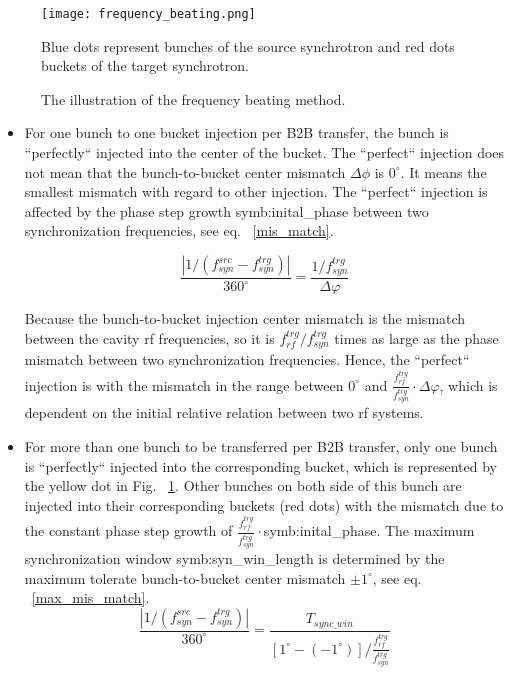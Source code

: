 \begin{figure}[!htb]
   \centering   
   \texttt{[image: frequency\_beating.png]}
   \caption{The illustration of the frequency beating method.}{Blue dots represent bunches of the source synchrotron and red dots buckets of the target synchrotron.}
   \label{frequency_beat}
\end{figure}
\begin{itemize}
\item
For one bunch to one bucket injection per B2B transfer, the bunch is ``perfectly`` injected into the center of the bucket. The ``perfect`` injection does not mean that the bunch-to-bucket center mismatch $\Delta \phi$ is $0^\circ$. It means the smallest mismatch with regard to other injection. The ``perfect`` injection is affected by the phase step growth \gls{symb:inital_phase} between two synchronization frequencies, see eq. ~\ref{mis_match}. 

\begin{equation}
\frac{|1/(f_{\mathit{syn}}^\mathit{src}-f_{\mathit{syn}}^\mathit{trg})|}{360^\circ} = \frac{1/f_{\mathit{syn}}^\mathit{trg}}{\Delta \varphi}\label{mis_match}
\end{equation}

Because the bunch-to-bucket injection center mismatch is the mismatch between the cavity rf frequencies, so it is $f_{\mathit{rf}}^{trg}/f_{\mathit{syn}}^{trg}$ times as large as the phase mismatch between two synchronization frequencies. Hence, the ``perfect`` injection is with the mismatch in the range between $0^\circ$ and $\frac{f_{\mathit{rf}}^\mathit{trg}}{f_{\mathit{syn}}^\mathit{trg}}\cdot\Delta \varphi$, which is dependent on the initial relative relation between two rf systems.

\item 
For more than one bunch to be transferred per B2B transfer, only one bunch is ``perfectly`` injected into the corresponding bucket, which is represented by the yellow dot in Fig. ~\ref{frequency_beat}. Other bunches on both side of this bunch are injected into their corresponding buckets (red dots) with the mismatch due to the constant phase step growth of $\frac{f_{\mathit{rf}}^\mathit{trg}}{f_{\mathit{syn}}^\mathit{trg}}\cdot$\gls{symb:inital_phase}. The maximum synchronization window \gls{symb:syn_win_length} is determined by the maximum tolerate bunch-to-bucket center mismatch $\pm 1^\circ$, see eq. ~\ref{max_mis_match}.
\begin{equation}
\frac{|1/(f_{\mathit{syn}}^\mathit{src}-f_{\mathit{syn}}^\mathit{trg})|}{360^\circ} = \frac{T_{\mathit{sync\_win}}}{[1^\circ-(-1^\circ)]/\frac{f_{\mathit{rf}}^\mathit{trg}}{f_{\mathit{syn}}^\mathit{trg}}}\label{max_mis_match}
\end{equation}

\end{itemize}

